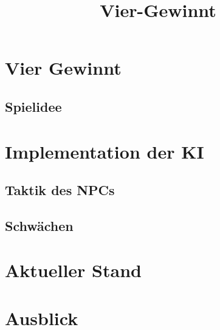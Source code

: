 \documentclass[12pt,a4paper,ngerman]{article}
\title{Vier-Gewinnt}
\author{}
\begin{document}
	\maketitle
	\tableofcontents
	\newpage
	\section{Vier Gewinnt}
	\subsection{Spielidee}
	
	\section{Implementation der KI}
	\subsection{Taktik des NPCs}
	\subsection{Schwächen}
	\section{Aktueller Stand}
	\section{Ausblick}
	
\end{document}
